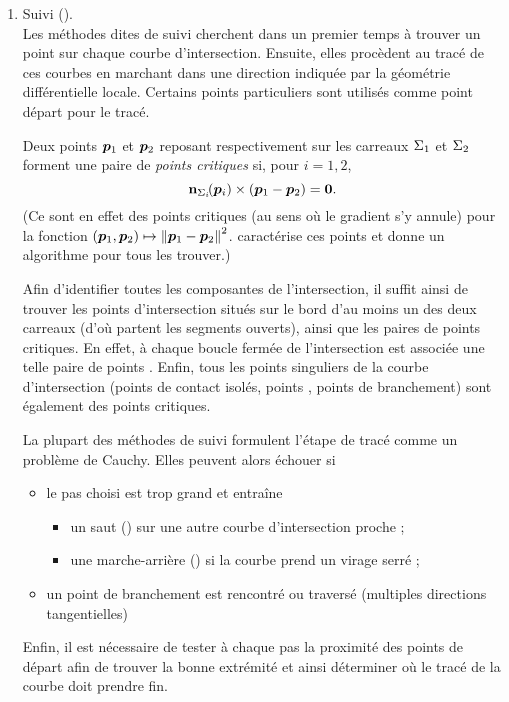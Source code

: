 \begin{enumerate}
	\item Suivi ().\\
	Les méthodes dites de suivi cherchent dans un premier temps à trouver un point sur chaque courbe d'intersection. 
	Ensuite, elles procèdent au tracé de ces courbes en marchant dans une direction indiquée par la géométrie différentielle locale. 
	Certains points particuliers sont utilisés comme point départ pour le tracé.
	\begin{definition}\label{def:points_critiques}
		Deux points $\bm{p}_1$ et $\bm{p}_2$ reposant respectivement sur les carreaux $\Sigma_1$ et $\Sigma_2$ forment une paire de \emph{points critiques} si, pour $i = 1,2$,
		\begin{equation}
			{ \mathbf{n}_{\ensuremath{\Sigma}_i}\!(\bm{p}_i) } \times {(\bm{p}_1 - \bm{p}_2)} = \bm{0}.
		\end{equation}
		(Ce sont en effet des points critiques (au sens où le gradient s'y annule) pour la fonction $(\bm{p}_1, \bm{p}_2) \mapsto \left\| {\bm{p}_1 - \bm{p}_2} \right\|^2$. 
		\cite{yamaguchi1998} caractérise ces points et donne un algorithme pour tous les trouver.)
	\end{definition}
	Afin d'identifier toutes les composantes de l'intersection, il suffit ainsi de trouver les points d'intersection situés sur le bord d'au moins un des deux carreaux (d'où partent les segments ouverts), ainsi que les paires de points critiques. 
	En effet, à chaque boucle fermée de l'intersection est associée une telle paire de points \cite{sederberg1989}.
	Enfin, tous les points singuliers de la courbe d'intersection (points de contact isolés, points , points de branchement) sont également des points critiques. \par
	La plupart des méthodes de suivi formulent l'étape de tracé comme un problème de Cauchy. 
	Elles peuvent alors échouer si
	\begin{itemize}
		\item le pas choisi est trop grand et entraîne 
		\begin{itemize}
			\item un saut () sur une autre courbe d'intersection proche ;
			\item une marche-arrière () si la courbe prend un virage serré ;
		\end{itemize}
		\item un point de branchement est rencontré ou traversé (multiples directions tangentielles)
	\end{itemize}
	Enfin, il est nécessaire de tester à chaque pas la proximité des points de départ afin de trouver la bonne extrémité et ainsi déterminer où le tracé de la courbe doit prendre fin.
\end{enumerate}




